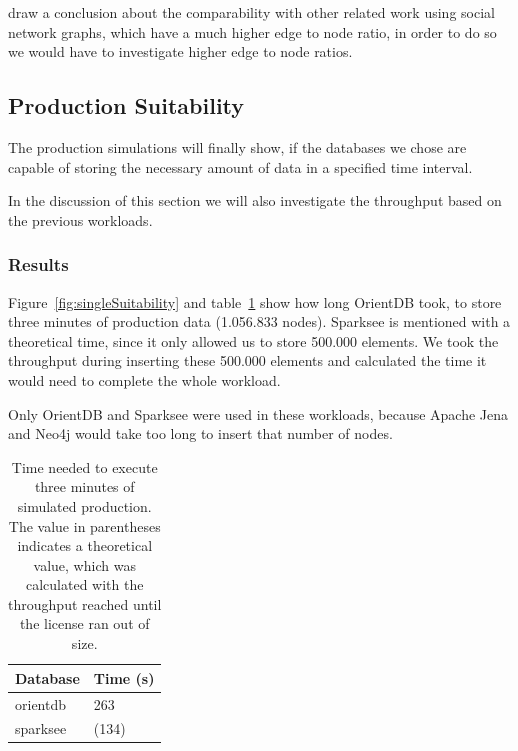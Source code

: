  draw a conclusion about the comparability with other related work using social network graphs,
which have a much higher edge to node ratio,
in order to do so we would have to investigate higher edge to node ratios.

\subsection{Production Suitability}
\label{ch:evaluation:se:productionSuitability}
The production simulations will finally show,
if the databases we chose are capable of storing the necessary amount of data in a specified time interval.

In the discussion of this section we will also investigate the throughput based on the previous workloads.

\subsubsection{Results}
Figure~\ref{fig:singleSuitability} and table~\ref{tab:singleSuitability} show how long OrientDB took,
to store three minutes of production data (1.056.833 nodes).
Sparksee is mentioned with a theoretical time,
since it only allowed us to store 500.000 elements.
We took the throughput during inserting these 500.000 elements and calculated the time it would need to complete the whole workload.

Only OrientDB and Sparksee were used in these workloads,
because Apache Jena and Neo4j would take too long to insert that number of nodes.

\begin{table}[h!]
  \begin{minipage}{\textwidth}
    \centering
    \begin{tabular}{ | l | l | }
      \hline
      Database & Time (s) \\ \hline
      orientdb & 263 \\ \hline
      sparksee & (134) \\ \hline
    \end{tabular}
  \end{minipage}
  \caption{Time needed to execute three minutes of simulated production.
  The value in parentheses indicates a theoretical value,
  which was calculated with the throughput reached until the license ran out of size.}
  \label{tab:singleSuitability}
\end{table}

